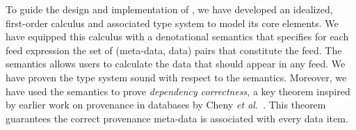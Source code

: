 

To guide the design and implementation of \padsd{}, we have developed
an idealized, first-order calculus and associated type system to model
its core elements.  We have equipped this calculus with a denotational
semantics that specifies for each feed expression the set of
(meta-data, data) pairs that constitute the feed. 
The semantics
allows users to calculate the data that should appear in any feed.
We have
proven the type system sound with respect to the semantics.
Moreover, we have used the
semantics to prove {\em dependency correctness}, a key theorem
inspired by earlier work on provenance in databases by 
Cheny {\em et al.}~\cite{cheney-dbpl07}.  This theorem
guarantees the correct provenance meta-data is associated with
every data item.  

